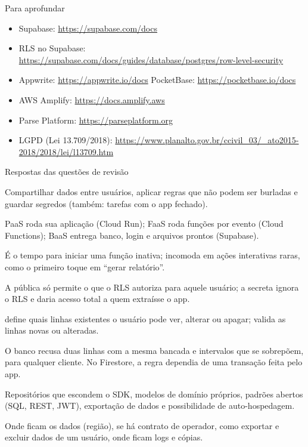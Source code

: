 \documentclass[aspectratio=169,10pt]{beamer}
\begin{document}
\begin{frame}{Para aprofundar}
  \small
  \begin{itemize}
    \item Supabase: \url{https://supabase.com/docs}
    \item RLS no Supabase: \url{https://supabase.com/docs/guides/database/postgres/row-level-security}
    \item Appwrite: \url{https://appwrite.io/docs} \quad PocketBase: \url{https://pocketbase.io/docs}
    \item AWS Amplify: \url{https://docs.amplify.aws}
    \item Parse Platform: \url{https://parseplatform.org}
    \item LGPD (Lei 13.709/2018): \url{https://www.planalto.gov.br/ccivil_03/_ato2015-2018/2018/lei/l13709.htm}
  \end{itemize}
\end{frame}

\begin{frame}{Respostas das questões de revisão}
  \begin{respostas}
    \item Compartilhar dados entre usuários, aplicar regras que não podem ser burladas e guardar segredos (também: tarefas com o app fechado).
    \item PaaS roda sua aplicação (Cloud Run); FaaS roda funções por evento (Cloud Functions); BaaS entrega banco, login e arquivos prontos (Supabase).
    \item É o tempo para iniciar uma função inativa; incomoda em ações interativas raras, como o primeiro toque em ``gerar relatório''.
    \item A pública só permite o que o RLS autoriza para aquele usuário; a secreta ignora o RLS e daria acesso total a quem extraísse o app.
    \item {} define quais linhas existentes o usuário pode ver, alterar ou apagar;  valida as linhas novas ou alteradas.
    \item O banco recusa duas linhas com a mesma bancada e intervalos que se sobrepõem, para qualquer cliente. No Firestore, a regra dependia de uma transação feita pelo app.
    \item Repositórios que escondem o SDK, modelos de domínio próprios, padrões abertos (SQL, REST, JWT), exportação de dados e possibilidade de auto-hospedagem.
    \item Onde ficam os dados (região), se há contrato de operador, como exportar e excluir dados de um usuário, onde ficam logs e cópias.
  \end{respostas}
\end{frame}

\end{document}
